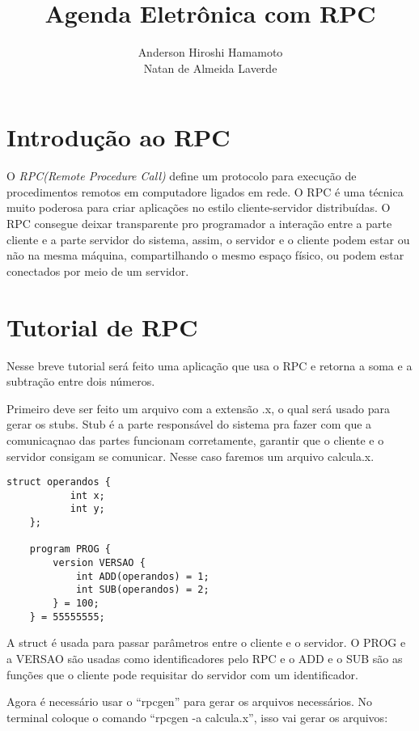 \documentclass[12pt,a4paper]{article}
\author{Anderson Hiroshi Hamamoto \\ Natan de Almeida Laverde}
\date{}
\title{Agenda Eletrônica com RPC}
\begin{document}
\maketitle

\section{Introdução ao RPC}

O \textit{RPC(Remote Procedure Call)} define um protocolo para execução de procedimentos
remotos em computadore ligados em rede\cite{penta2}. O RPC é uma técnica muito poderosa para
criar aplicações no estilo cliente-servidor distribuídas\cite{marshall}. O RPC consegue deixar
transparente pro programador a interação entre a parte cliente e a parte servidor do 
sistema, assim, o servidor e o cliente podem estar ou não na mesma máquina, compartilhando
o mesmo espaço físico, ou podem estar conectados por meio de um servidor. 

\section{Tutorial de RPC}

Nesse breve tutorial será feito uma aplicação que usa o RPC e retorna a soma e a subtração 
entre dois números.

Primeiro deve ser feito um arquivo com a extensão .x, o qual será usado para gerar os stubs. 
Stub é a parte responsável do sistema pra fazer com que a comunicaçnao das partes funcionam
corretamente, garantir que o cliente e o servidor consigam se comunicar. Nesse caso faremos
um arquivo calcula.x.

\lstset{language=C}
\begin{lstlisting}[caption=calcula.x]
	struct operandos {
	       int x;
	       int y;
	};

	program PROG {
		version VERSAO {
			int ADD(operandos) = 1;
			int SUB(operandos) = 2;
		} = 100;
	} = 55555555;
\end{lstlisting}

A struct é usada para passar parâmetros entre o cliente e o servidor. O PROG e a VERSAO
são usadas como identificadores pelo RPC e o ADD e o SUB são as funções que o cliente pode
requisitar do servidor com um identificador.

Agora é necessário usar o ``rpcgen'' para gerar os arquivos necessários. No terminal 
coloque o comando ``rpcgen -a calcula.x'', isso vai gerar os arquivos:
\end{document}
